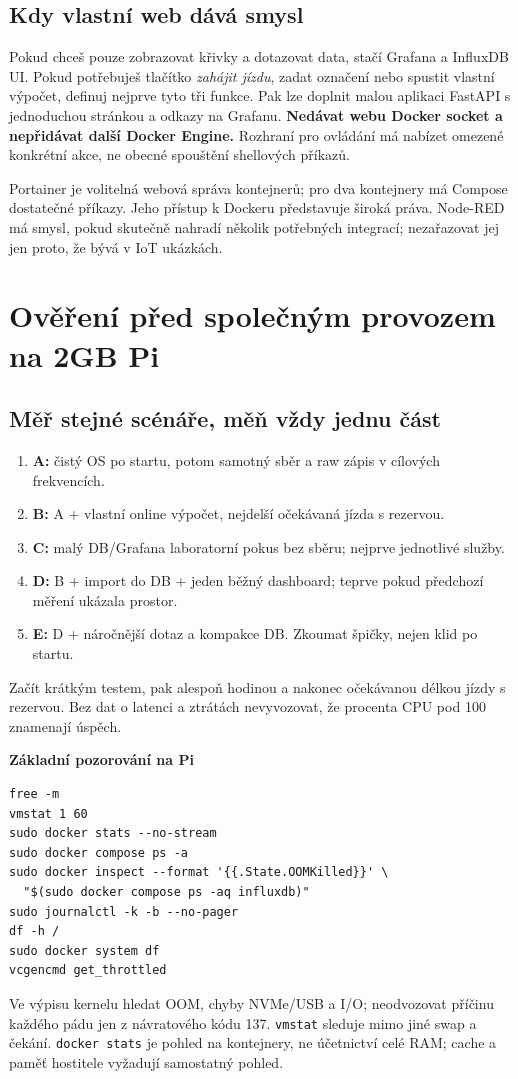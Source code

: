 \documentclass[11pt,a4paper]{article}
\newcommand{\krok}[1]{\par\noindent\textbf{#1}\par}
\begin{document}
\subsection{Kdy vlastní web dává smysl}
Pokud chceš pouze zobrazovat křivky a dotazovat data, stačí Grafana a InfluxDB UI. Pokud potřebuješ tlačítko \emph{zahájit jízdu}, zadat označení nebo spustit vlastní výpočet, definuj nejprve tyto tři funkce. Pak lze doplnit malou aplikaci FastAPI s jednoduchou stránkou a odkazy na Grafanu. \textbf{Nedávat webu Docker socket a nepřidávat další Docker Engine.} Rozhraní pro ovládání má nabízet omezené konkrétní akce, ne obecné spouštění shellových příkazů.

Portainer je volitelná webová správa kontejnerů; pro dva kontejnery má Compose dostatečné příkazy. Jeho přístup k Dockeru představuje široká práva. Node-RED má smysl, pokud skutečně nahradí několik potřebných integrací; nezařazovat jej jen proto, že bývá v IoT ukázkách.\cite{portainer}

\clearpage
\section{Ověření před společným provozem na 2GB Pi}
\subsection{Měř stejné scénáře, měň vždy jednu část}
\begin{enumerate}
\item \textbf{A:} čistý OS po startu, potom samotný sběr a raw zápis v cílových frekvencích.
\item \textbf{B:} A + vlastní online výpočet, nejdelší očekávaná jízda s rezervou.
\item \textbf{C:} malý DB/Grafana laboratorní pokus bez sběru; nejprve jednotlivé služby.
\item \textbf{D:} B + import do DB + jeden běžný dashboard; teprve pokud předchozí měření ukázala prostor.
\item \textbf{E:} D + náročnější dotaz a kompakce DB. Zkoumat špičky, nejen klid po startu.
\end{enumerate}
Začít krátkým testem, pak alespoň hodinou a nakonec očekávanou délkou jízdy s rezervou. Bez dat o latenci a ztrátách nevyvozovat, že procenta CPU pod 100 znamenají úspěch.

\krok{Základní pozorování na Pi}
\begin{lstlisting}
free -m
vmstat 1 60
sudo docker stats --no-stream
sudo docker compose ps -a
sudo docker inspect --format '{{.State.OOMKilled}}' \
  "$(sudo docker compose ps -aq influxdb)"
sudo journalctl -k -b --no-pager
df -h /
sudo docker system df
vcgencmd get_throttled
\end{lstlisting}
Ve výpisu kernelu hledat OOM, chyby NVMe/USB a I/O; neodvozovat příčinu každého pádu jen z návratového kódu 137. \texttt{vmstat} sleduje mimo jiné swap a čekání. \texttt{docker stats} je pohled na kontejnery, ne účetnictví celé RAM; cache a paměť hostitele vyžadují samostatný pohled.\cite{docker-memory}
\end{document}

